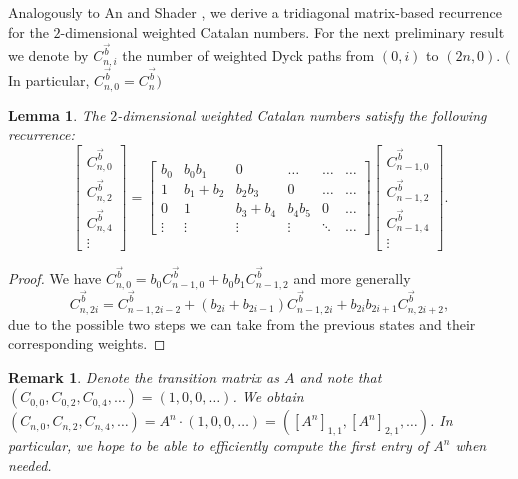 \documentclass[12pt,notitlepage]{amsart}
\numberwithin{equation}{section}
\theoremstyle{thmstyleone}%
\newtheorem{lemma}[theorem]{Lemma}
\theoremstyle{thmstyletwo}%
\newtheorem{remark}[theorem]{Remark}%
\theoremstyle{thmstylethree}%
\numberwithin{theorem}{section}
\numberwithin{equation}{section}
\begin{document}
Analogously to An \cite{ansthesis} and Shader \cite{shader2013weighted}, we derive a tridiagonal matrix-based recurrence for the $2$-dimensional weighted Catalan numbers. For the next preliminary result we denote by $C^{\vec{b}}_{n,i}$ the number of weighted Dyck paths from $(0,i)$ to $(2n,0)$. $($In particular, $C^{\vec{b}}_{n,0} = C^{\vec{b}}_{n})$

\begin{lemma} The $2$-dimensional weighted Catalan numbers satisfy the following recurrence:
\label{lemma:transmatrixcat}
 \[\begin{bmatrix}
C^{\vec{b}}_{n,0} \\
C^{\vec{b}}_{n,2} \\
C^{\vec{b}}_{n,4} \\
\vdots
\end{bmatrix} = 
\begin{bmatrix}
b_0 & b_0 b_1 & 0 & \dots  &\dots &\dots \\
1 & b_1 + b_2 & b_2 b_3 & 0 & \dots &\dots \\
0 & 1 & b_3 + b_4 & b_4 b_5 & 0 & \dots \\
\vdots & \vdots & \vdots & \vdots & \ddots &\dots
\end{bmatrix}
\begin{bmatrix}
C^{\vec{b}}_{n-1,0} \\
C^{\vec{b}}_{n-1,2} \\
C^{\vec{b}}_{n-1,4} \\
\vdots
\end{bmatrix}.
\] 
\end{lemma}
\begin{proof}
    We have $C^{\vec{b}}_{n,0} = b_0C^{\vec{b}}_{n-1,0}+b_0b_1C^{\vec{b}}_{n-1,2}$ and more generally $$C^{\vec{b}}_{n,2i} = C^{\vec{b}}_{n-1,2i-2} + (b_{2i}+b_{2i-1})C^{\vec{b}}_{n-1,2i} + b_{2i}b_{2i+1}C^{\vec{b}}_{n,2i+2},$$ due to the possible two steps we can take from the previous states and their corresponding weights. 
\end{proof}
\begin{remark}
\label{remark:firstentry}
    Denote the transition matrix as $A$ and note that $(C_{0,0}, C_{0,2}, C_{0,4}, \ldots) = (1, 0, 0, \ldots)$. We obtain $(C_{n,0}, C_{n,2}, C_{n,4}, \ldots) = A^n\cdot(1,0,0,\ldots) = ([A^n]_{1,1}, [A^n]_{2,1}, \dots)$. In particular, we hope to be able to efficiently compute the first entry of $A^n$ when needed. %
\end{remark}
\end{document}
